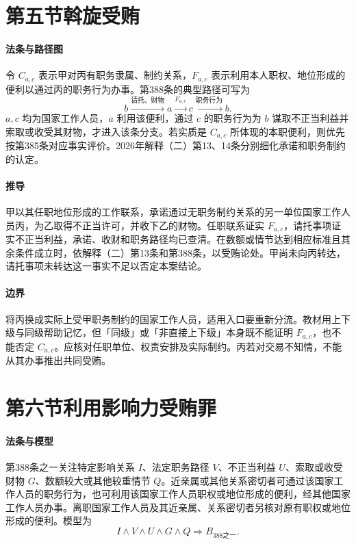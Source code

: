 \section{第五节\quad 斡旋受贿}

\paragraph{法条与路径图}
令 \(C_{a,c}\) 表示甲对丙有职务隶属、制约关系，\(F_{a,c}\) 表示利用本人职权、地位形成的便利以通过丙的职务行为办事。第388条的典型路径可写为
\[
b\xrightarrow{\text{请托、财物}}a
 \xrightarrow{F_{a,c}}c
 \xrightarrow{\text{职务行为}}b .
\]
\(a,c\) 均为国家工作人员，\(a\) 利用该便利，通过 \(c\) 的职务行为为 \(b\) 谋取不正当利益并索取或收受其财物，才进入该条分支。若实质是 \(C_{a,c}\) 所体现的本职便利，则优先按第385条对应事实评价。2026年解释（二）第13、14条分别细化承诺和职务制约的认定。

\paragraph{推导}
甲以其任职地位形成的工作联系，承诺通过无职务制约关系的另一单位国家工作人员丙，为乙取得不正当许可，并收下乙的财物。任职联系证实 \(F_{a,c}\)，请托事项证实不正当利益，承诺、收财和职务路径均已查清。在数额或情节达到相应标准且其余条件成立时，依解释（二）第13条和第388条，以受贿论处。甲尚未向丙转达，请托事项未转达这一事实不足以否定本案结论。

\paragraph{边界}
将丙换成实际上受甲职务制约的国家工作人员，适用入口要重新分流。教材用上下级与同级帮助记忆，但「同级」或「非直接上下级」本身既不能证明 \(F_{a,c}\)，也不能否定 \(C_{a,c}\)。应核对任职单位、权责安排及实际制约。丙若对交易不知情，不能从其办事推出共同受贿。

\section{第六节\quad 利用影响力受贿罪}

\paragraph{法条与模型}
第388条之一关注特定影响关系 \(I\)、法定职务路径 \(V\)、不正当利益 \(U\)、索取或收受财物 \(G\)、数额较大或其他较重情节 \(Q\)。近亲属或其他关系密切者可通过该国家工作人员的职务行为，也可利用该国家工作人员职权或地位形成的便利，经其他国家工作人员办事。离职国家工作人员及其近亲属、关系密切者另核对原有职权或地位形成的便利。模型为
\[
I\land V\land U\land G\land Q\Longrightarrow B_{388\text{之一}} .
\]

